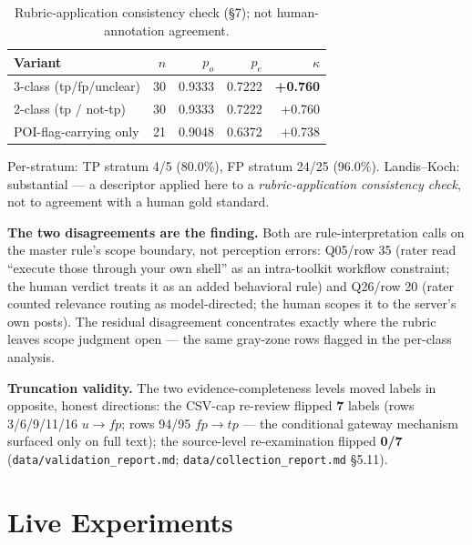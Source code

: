 \documentclass[10pt,conference]{IEEEtran}
\begin{document}
\begin{table}[!t]
\centering
\footnotesize
\begin{tabular}{@{}lrrrr@{}}
\toprule
Variant & $n$ & $p_o$ & $p_e$ & $\kappa$ \\
\midrule
3-class (tp/fp/unclear) & 30 & 0.9333 & 0.7222 & \textbf{+0.760} \\
2-class (tp / not-tp) & 30 & 0.9333 & 0.7222 & +0.760 \\
POI-flag-carrying only & 21 & 0.9048 & 0.6372 & +0.738 \\
\bottomrule
\end{tabular}
\caption{Rubric-application consistency check (\S7); not human-annotation agreement.}
\label{tab:kappa}
\end{table}

Per-stratum: TP stratum 4/5 (80.0\%), FP stratum 24/25 (96.0\%). Landis--Koch:
substantial --- a descriptor applied here to a \emph{rubric-application consistency
check}, not to agreement with a human gold standard.

\textbf{The two disagreements are the finding.} Both are rule-interpretation calls on the
master rule's scope boundary, not perception errors: Q05/row 35 (rater read ``execute
those through your own shell'' as an intra-toolkit workflow constraint; the human verdict
treats it as an added behavioral rule) and Q26/row 20 (rater counted relevance routing as
model-directed; the human scopes it to the server's own posts). The residual disagreement
concentrates exactly where the rubric leaves scope judgment open --- the same gray-zone
rows flagged in the per-class analysis.

\textbf{Truncation validity.} The two evidence-completeness levels moved labels in
opposite, honest directions: the CSV-cap re-review flipped \textbf{7} labels (rows
3/6/9/11/16 $u{\rightarrow}fp$; rows 94/95 $fp{\rightarrow}tp$ --- the conditional
gateway mechanism surfaced only on full text); the source-level re-examination flipped
\textbf{0/7} (\texttt{data/validation\_report.md}; \texttt{data/collection\_report.md}
\S5.11).

\section{Live Experiments}
\end{document}
